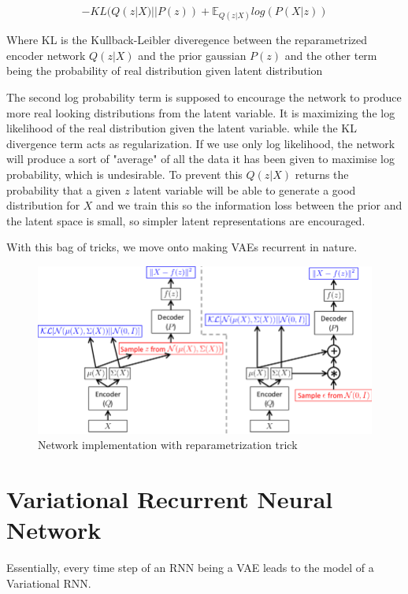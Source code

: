 \documentclass{article}
\begin{document}
\begin{equation*}
    - KL ( Q (z | X) || P(z) ) + \mathbb{E}_{Q(z | X)}
                                            log( P ( X | z ) )
\end{equation*}

Where KL is the Kullback-Leibler diveregence between the 
reparametrized encoder network $ Q(z|X) $ and the prior 
gaussian $ P(z) $ and the other term being the probability of real distribution given latent distribution

The second log probability term is supposed to encourage the network to produce more real
looking distributions from the latent variable. It is maximizing the log likelihood of
the real distribution given the latent variable.
while the KL divergence term acts as regularization. If we use only log likelihood, the network
will produce a sort of "average" of all the data it has been given to maximise log probability, which is undesirable.
To prevent this $ Q(z|X) $ returns the probability that a given $ z $ latent variable will be able to generate a good distribution
for $ X $ and we train this so the information loss between the prior and the latent space is small, so simpler latent representations are encouraged.

With this bag of tricks, we move onto making VAEs recurrent in nature.

\begin{figure}[h!]
    \includegraphics{VAENetwork.jpg}
    \caption{Network implementation with reparametrization trick}
    \label{fig:fig1}
\end{figure}

\section{Variational Recurrent Neural Network}

Essentially, every time step of an RNN being a VAE leads to the model of a Variational RNN.
\end{document}
